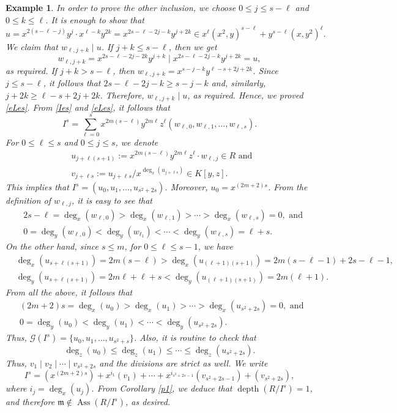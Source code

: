 \documentclass[11pt]{amsart}
\newtheorem{example}[theorem]{Example}
\def\Ass{\operatorname{Ass}}
\def\depth{\operatorname{depth}}
\begin{document}
\begin{example}
{In order to prove the other inclusion, we choose $0\leq j\leq s-\ell$
and $0\leq k\leq \ell$. It is enough to show that 
$$u=x^{2(s-\ell-j)}y^{j}\cdot x^{\ell-k}y^{2k} = x^{2s-\ell-2j-k}y^{j+2k} \in x^{\ell}(x^2,y)^{s-\ell}+y^{s-\ell}(x,y^2)^{\ell}.$$
We claim that $w_{\ell,j+k}\mid u$. If $j+k\leq s-\ell$, then we get 
$$w_{\ell,j+k}=x^{2s-\ell-2j-2k}y^{j+k}\mid x^{2s-\ell-2j-k}y^{j+2k} = u,$$   as required. 
If $j+k>s-\ell$, then $w_{\ell,j+k}=x^{s-j-k}y^{\ell-s+2j+2k}$. Since $j\leq s-\ell$, it follows that
$2s-\ell-2j-k\geq s-j-k$ and, similarly, $j+2k\geq \ell-s+2j+2k$. Therefore, $w_{\ell,j+k}\mid u$, as required. 
Hence, we proved \eqref{eLes}. From \eqref{Ies} and \eqref{eLes},  it follows that
$$I^s = \sum_{\ell=0}^s x^{2m(s-\ell)}y^{2m\ell}z^{\ell} (w_{\ell,0},w_{\ell,1},\ldots,w_{\ell,s}).$$
For $0\leq \ell\leq s$ and $0\leq j\leq s$, we denote
\begin{align*}
& u_{j+\ell (s+1)}:= x^{2m(s-\ell)}y^{2m\ell}z^{\ell}\cdot w_{\ell,j}\in R\text{ and }\\
& v_{j+\ell s}:=u_{j+\ell s}/x^{\deg_x(u_{j+\ell s})}\in K[y,z].
\end{align*}
This implies that  $I^s=(u_0,u_1,\ldots,u_{s^2+2s})$. Moreover, $u_0=x^{(2m+2)s}$. 
From the definition of $w_{\ell,j}$, it is easy to see
that 
\begin{align*}
& 2s-\ell = \deg_x(w_{\ell,0})>\deg_x(w_{\ell,1})>\cdots >\deg_x(w_{\ell,s}) = 0,  \text{ and}\\
& 0 = \deg_y(w_{\ell,0})<\deg_y(w_{\ell_1})< \cdots < \deg_y(w_{\ell,s}) = \ell+s.
\end{align*}
On the other hand, since $s\leq m$, for $0\leq\ell\leq s-1$, we have 
\begin{align*}
& \deg_x(u_{s + \ell(s+1)}) = 2m(s-\ell) >  \deg_x (u_{(\ell+1)(s+1)}) = 2m(s-\ell-1)+2s-\ell-1,\\
& \deg_y(u_{s + \ell(s+1)}) = 2m\ell + \ell+s < \deg_y (u_{(\ell+1)(s+1)}) =2m(\ell+1).
\end{align*}
From all the above, it follows that
\begin{align*}
&(2m+2)s=\deg_x(u_0)>\deg_x(u_1)>\cdots>\deg_x(u_{s^2+2s})=0,  \text{ and }\\
& 0=\deg_y(u_0)<\deg_y(u_1)<\cdots<\deg_y(u_{s^2+2s}).
\end{align*}
Thus, $\mathcal G(I^s)=\{u_0,u_1,\ldots,u_{s^2+s}\}$.
Also, it is routine to check that  $$\deg_z(u_0)\leq \deg_z(u_1) \leq \cdots \leq \deg_z(u_{s^2+2s}).$$ Thus, 
$v_1\mid v_2 \mid \cdots \mid v_{s^2+2s}$ and the divisions are strict as well. We write 
$$I^s = (x^{(2m+2)s})+x^{i_1}(v_1)+ \cdots + x^{i_{s^2+2s-1}}(v_{s^2+2s-1})+(v_{s^2+2s}),$$
where $i_j=\deg_x(u_j)$. From Corollary  \ref{p1}, we deduce that  $\depth(R/I^s)=1$, and therefore $\mathfrak m\notin \Ass(R/I^s)$, 
as desired.
   }
\end{example}
\end{document}

